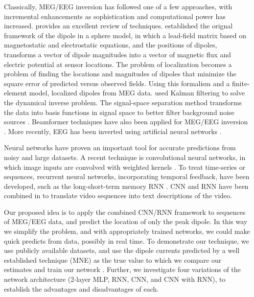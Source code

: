 \documentclass[journal,12pt,onecolumn,draftclsnofoot,]{IEEEtran}
\begin{document}
Classically, MEG/EEG inversion has followed one of a few approaches, with incremental enhancements as sophistication and computational power has increased. \cite{grech2008review} provides an excellent review of techniques. \cite{mosher1992multiple} established the orignal framework of the dipole in a sphere model, in which a lead-field matrix based on magnetostatic and electrostatic equations, and the positions of dipoles, transforms a vector of dipole magnitudes into a vector of magnetic flux and electric potential at sensor locations. The problem of localization becomes a problem of finding the locations and magnitudes of dipoles that minimize the square error of predicted versus observed fields. Using this formalism and a finite-element model, \cite{buchner1997inverse} localized dipoles from MEG data. \cite{galka2004solution} used Kalman filtering to solve the dynamical inverse problem. The signal-space separation method transforms the data into basis functions in signal space to better filter background noise sources \cite{taulu2005applications}. Beamformer techniques have also been applied for MEG/EEG inversion \cite{sekihara2001reconstructing}. More recently, EEG has been inverted using artificial neural networks \cite{van2000eeg}.


Neural networks have proven an important tool for accurate predictions from noisy and large datasets. A recent technique is convolutional neural networks, in which image inputs are convolved with weighted kernels \cite{lecun1998gradient}. To treat time-series or sequences, recurrent neural networks, incorporating temporal feedback, have been developed, such as the long-short-term memory RNN \cite{hochreiter1997long}. CNN and RNN have been combined in \cite{venugopalan2014translating} to translate video sequences into text descriptions of the video.


Our proposed idea is to apply the combined CNN/RNN framework to sequences of MEG/EEG data, and predict the location of only the peak dipole. In this way we simplify the problem, and with appropriately trained networks, we could make quick predicts from data, possibly in real time. To demonstrate our technique, we use publicly available datasets, and use the dipole currents predicted by a well established technique (MNE) as the true value to which we compare our estimates and train our network \cite{gramfort2014mne}. Further, we investigate four variations of the network architecture (2-layer MLP, RNN, CNN, and CNN with RNN), to establish the advantages and disadvantages of each.
\end{document}
